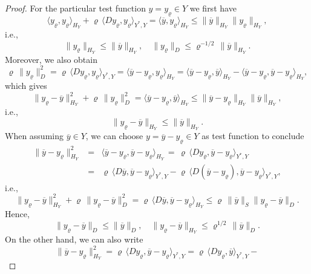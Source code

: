 \documentclass[10pt,a4paper]{amsart}
\begin{document}
\begin{proof}
  For the particular test function $y = y_\varrho \in Y$ we first have
  \[
    \langle y_\varrho , y_\varrho \rangle_{H_Y} +
    \varrho \, \langle D y_\varrho , y_\varrho  \rangle_{Y^*,Y} =
    \langle \overline{y} , y_\varrho \rangle_{H_Y} \leq
    \| \overline{y} \|_{H_Y} \| y_\varrho \|_{H_Y},
  \]
  i.e.,
  \[
    \| y_\varrho \|_{H_Y} \leq \| \overline{y} \|_{H_Y} , \quad
    \| y_\varrho \|_D \leq \varrho^{-1/2} \, \| \overline{y} \|_{H_Y} .
  \]
  Moreover, we also obtain
  \[
    \varrho \, \| y_\varrho \|_D^2 =
    \varrho \, \langle D y_\varrho , y_\varrho \rangle_{Y^*,Y} =
    \langle \overline{y} - y_\varrho , y_\varrho \rangle_{H_Y} =
    \langle \overline{y} - y_\varrho , \overline{y} \rangle_{H_Y} -
    \langle \overline{y} - y_\varrho , \overline{y} - y_\varrho \rangle_{H_Y},
  \]
  which gives
  \[
    \| y_\varrho - \overline{y} \|_{H_Y}^2 + \varrho \, \| y_\varrho \|^2_D =
    \langle \overline{y} - y_\varrho , \overline{y} \rangle_{H_Y} \leq
    \| \overline{y} - y_\varrho \|_{H_Y} \| \overline{y} \|_{H_Y} ,
  \]
  i.e.,
  \[
    \| y_\varrho - \overline{y} \|_{H_Y} \leq \| \overline{y} \|_{H_Y}.
  \]
  When assuming $\overline{y} \in Y$, we can choose
  $y = \overline{y} - y_\varrho \in Y$ as test function to conclude
  \begin{eqnarray*}
    \| \overline{y} - y_\varrho \|^2_{H_Y}
    & = & \langle \overline{y} - y_\varrho , \overline{y} - y_\varrho
          \rangle_{H_Y} \, = \,
          \varrho \, \langle D y_\varrho ,
          \overline{y} - y_\varrho \rangle_{Y^*,Y} \\
    & = & \varrho \, \langle D \overline{y} , \overline{y} - y_\varrho
          \rangle_{Y^*,Y} - \varrho \, \langle D (\overline{y} - y_\varrho),
          \overline{y} - y_\varrho \rangle_{Y^*,Y},
  \end{eqnarray*}
  i.e.,
  \[
    \| y_\varrho - \overline{y} \|_{H_Y}^2 + \varrho \,
    \| y_\varrho - \overline{y} \|_D^2 =
    \varrho \, \langle D \overline{y} , \overline{y} - y_\varrho \rangle_{H_Y}
    \leq
    \varrho \, \| \overline{y} \|_S \| y_\varrho - \overline{y} \|_D .
  \]
  Hence,
  \[
    \| y_\varrho - \overline{y} \|_D \leq \| \overline{y} \|_D , \quad
    \| y_\varrho - \overline{y} \|_{H_Y} \leq \varrho^{1/2} \,
    \| \overline{y} \|_D .
  \]
  On the other hand, we can also write
  \[
    \| \overline{y} - y_\varrho \|^2_{H_Y}
    =
    \varrho \, \langle D y_\varrho ,
    \overline{y} - y_\varrho \rangle_{Y^*,Y} =
    \varrho \, \langle D y_\varrho , \overline{y} \rangle_{Y^*,Y} -
\]
\end{proof}
\end{document}
